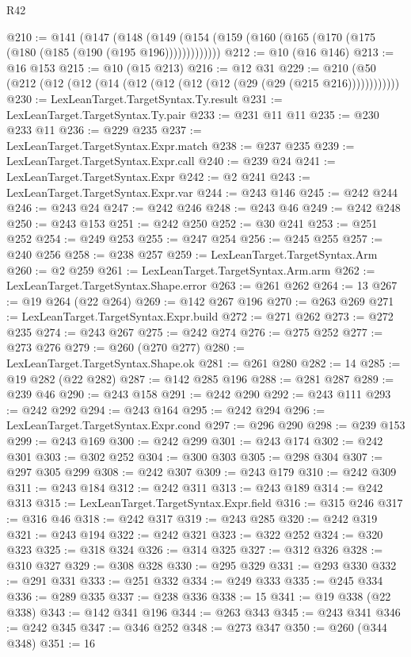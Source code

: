 \begin{lexlean}{R42}
\begin{coremodule}
@210 := @141
    (@147 (@148 (@149 (@154 (@159 (@160 (@165 (@170 (@175 (@180 (@185 (@190 (@195 @196)))))))))))))
@212 := @10 (@16 @146)
@213 := @16 @153
@215 := @10 (@15 @213)
@216 := @12 @31
@229 := @210 (@50 (@212 (@12 (@12 (@14 (@12 (@12 (@12 (@12 (@29 (@29 (@215 @216))))))))))))
@230 := LexLeanTarget.TargetSyntax.Ty.result
@231 := LexLeanTarget.TargetSyntax.Ty.pair
@233 := @231 @11 @11
@235 := @230 @233 @11
@236 := @229 @235
@237 := LexLeanTarget.TargetSyntax.Expr.match
@238 := @237 @235
@239 := LexLeanTarget.TargetSyntax.Expr.call
@240 := @239 @24
@241 := LexLeanTarget.TargetSyntax.Expr
@242 := @2 @241
@243 := LexLeanTarget.TargetSyntax.Expr.var
@244 := @243 @146
@245 := @242 @244
@246 := @243 @24
@247 := @242 @246
@248 := @243 @46
@249 := @242 @248
@250 := @243 @153
@251 := @242 @250
@252 := @30 @241
@253 := @251 @252
@254 := @249 @253
@255 := @247 @254
@256 := @245 @255
@257 := @240 @256
@258 := @238 @257
@259 := LexLeanTarget.TargetSyntax.Arm
@260 := @2 @259
@261 := LexLeanTarget.TargetSyntax.Arm.arm
@262 := LexLeanTarget.TargetSyntax.Shape.error
@263 := @261 @262
@264 := 13
@267 := @19 @264 (@22 @264)
@269 := @142 @267 @196
@270 := @263 @269
@271 := LexLeanTarget.TargetSyntax.Expr.build
@272 := @271 @262
@273 := @272 @235
@274 := @243 @267
@275 := @242 @274
@276 := @275 @252
@277 := @273 @276
@279 := @260 (@270 @277)
@280 := LexLeanTarget.TargetSyntax.Shape.ok
@281 := @261 @280
@282 := 14
@285 := @19 @282 (@22 @282)
@287 := @142 @285 @196
@288 := @281 @287
@289 := @239 @46
@290 := @243 @158
@291 := @242 @290
@292 := @243 @111
@293 := @242 @292
@294 := @243 @164
@295 := @242 @294
@296 := LexLeanTarget.TargetSyntax.Expr.cond
@297 := @296 @290
@298 := @239 @153
@299 := @243 @169
@300 := @242 @299
@301 := @243 @174
@302 := @242 @301
@303 := @302 @252
@304 := @300 @303
@305 := @298 @304
@307 := @297 @305 @299
@308 := @242 @307
@309 := @243 @179
@310 := @242 @309
@311 := @243 @184
@312 := @242 @311
@313 := @243 @189
@314 := @242 @313
@315 := LexLeanTarget.TargetSyntax.Expr.field
@316 := @315 @246
@317 := @316 @46
@318 := @242 @317
@319 := @243 @285
@320 := @242 @319
@321 := @243 @194
@322 := @242 @321
@323 := @322 @252
@324 := @320 @323
@325 := @318 @324
@326 := @314 @325
@327 := @312 @326
@328 := @310 @327
@329 := @308 @328
@330 := @295 @329
@331 := @293 @330
@332 := @291 @331
@333 := @251 @332
@334 := @249 @333
@335 := @245 @334
@336 := @289 @335
@337 := @238 @336
@338 := 15
@341 := @19 @338 (@22 @338)
@343 := @142 @341 @196
@344 := @263 @343
@345 := @243 @341
@346 := @242 @345
@347 := @346 @252
@348 := @273 @347
@350 := @260 (@344 @348)
@351 := 16

\end{coremodule}
\end{lexlean}
